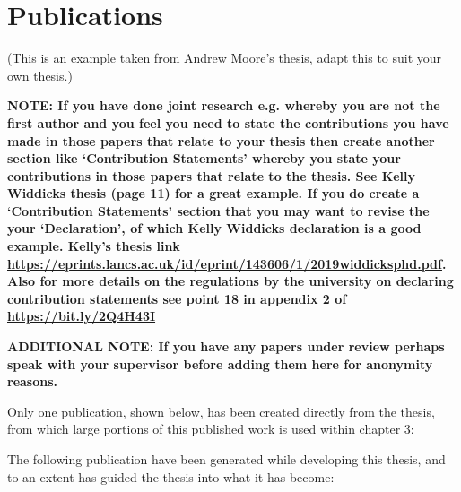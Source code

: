 \section*{\centering Publications}
(This is an example taken from Andrew Moore's thesis, adapt this to suit your own thesis.)

\textbf{NOTE: If you have done joint research e.g. whereby you are not the first author and you feel you need to state the contributions you have made in those papers that relate to your thesis then create another section like `Contribution Statements' whereby you state your contributions in those papers that relate to the thesis. See Kelly Widdicks thesis (page 11) for a great example. If you do create a `Contribution Statements' section that you may want to revise the your `Declaration', of which Kelly Widdicks declaration is a good example. Kelly's thesis link \url{https://eprints.lancs.ac.uk/id/eprint/143606/1/2019widdicksphd.pdf}. Also for more details on the regulations by the university on declaring contribution statements see point 18 in appendix 2 of \url{https://bit.ly/2Q4H43I}}

\textbf{ADDITIONAL NOTE: If you have any papers under review perhaps speak with your supervisor before adding them here for anonymity reasons.}\vspace{1cm}

Only one publication, shown below, has been created directly from the thesis, from which large portions of this published work is used within chapter 3:\bigskip

\noindent {}\vspace{24pt}

\noindent The following publication have been generated while developing this thesis, and to an extent has guided the thesis into what it has become:\bigskip

\noindent {}\bigskip

\noindent {}\bigskip

\noindent {}\bigskip

\noindent {}